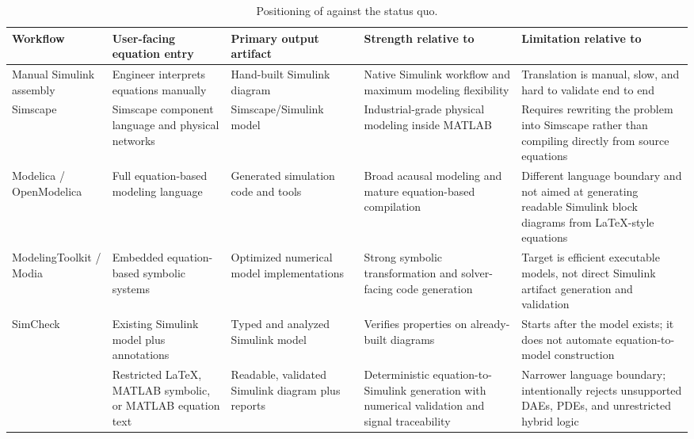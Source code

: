 \documentclass[colorlinks,upint,subscriptcorrection,varvw,balance,nofoot]{asmeconf}
\newcommand{\EqnToSim}{\NoCaseChange{Eqn2Sim}}
\begin{document}
\begin{table}[t]
\caption{Positioning of \EqnToSim{} against the status quo.}
\label{tab:positioning}
\centering
\footnotesize
\begin{tabularx}{\textwidth}{@{}l X X X X@{}}
\toprule
Workflow & User-facing equation entry & Primary output artifact & Strength relative to \EqnToSim{} & Limitation relative to \EqnToSim{} \\
\midrule
Manual Simulink assembly \cite{mathworks2025simulink} & Engineer interprets equations manually & Hand-built Simulink diagram & Native Simulink workflow and maximum modeling flexibility & Translation is manual, slow, and hard to validate end to end \\
Simscape \cite{mathworks2026simscape} & Simscape component language and physical networks & Simscape/Simulink model & Industrial-grade physical modeling inside MATLAB & Requires rewriting the problem into Simscape rather than compiling directly from source equations \\
Modelica / OpenModelica \cite{fritzson1998modelica,fritzson2020openmodelica} & Full equation-based modeling language & Generated simulation code and tools & Broad acausal modeling and mature equation-based compilation & Different language boundary and not aimed at generating readable Simulink block diagrams from \LaTeX{}-style equations \\
ModelingToolkit / Modia \cite{ma2021modelingtoolkit,elmqvist2021modia} & Embedded equation-based symbolic systems & Optimized numerical model implementations & Strong symbolic transformation and solver-facing code generation & Target is efficient executable models, not direct Simulink artifact generation and validation \\
SimCheck \cite{roy2010simcheck} & Existing Simulink model plus annotations & Typed and analyzed Simulink model & Verifies properties on already-built diagrams & Starts after the model exists; it does not automate equation-to-model construction \\
\EqnToSim{} & Restricted \LaTeX{}, MATLAB symbolic, or MATLAB equation text & Readable, validated Simulink diagram plus reports & Deterministic equation-to-Simulink generation with numerical validation and signal traceability & Narrower language boundary; intentionally rejects unsupported DAEs, PDEs, and unrestricted hybrid logic \\
\bottomrule
\end{tabularx}
\end{table}
\end{document}
